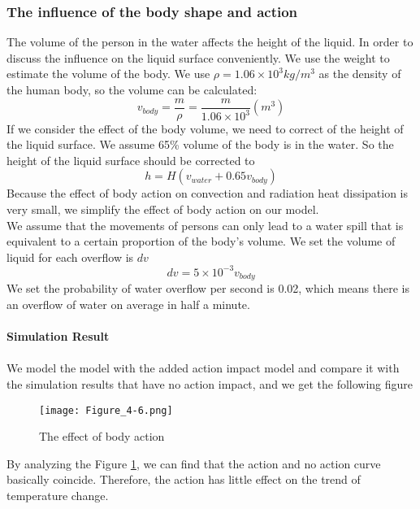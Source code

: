 \documentclass{mcmthesis}
\begin{document}
\subsubsection{The influence of the body shape and action}
The volume of the person in the water affects the height of the liquid. In order to discuss the influence on the liquid surface conveniently. We use the weight to estimate the volume of the body. We use $\rho =1.06\times10^{3}kg/m^{3}$ as the density of the human body, so the volume can be calculated:
\begin{equation}
v_{body}=\frac{m}{\rho }=\frac{m}{1.06\times 10^{3}}(m^{3})
\end{equation}
\indent If we consider the effect of the body volume, we need to correct of the height of the liquid surface. We assume 65\% volume of the body is in the water. So the height of the liquid surface should be corrected to\\
\begin{equation}
	h=H(v_{water}+0.65v_{body})
\end{equation}
\indent Because the effect of body action on convection and radiation heat dissipation is very small, we simplify the effect of body action on our model.\\
\indent We assume that the movements of persons can only lead to a water spill that is equivalent to a certain proportion of the body's volume. We set the volume of liquid for each overflow is $dv$
\begin{equation}
	dv=5\times10^{-3}v_{body}
\end{equation}
\indent We set the probability of water overflow per second is 0.02, which means there is an overflow of water on average in half a minute.\\\\
\noindent
\textbf{Simulation Result}\\\\
\indent We model the model with the added action impact model and compare it with the simulation results that have no action impact, and we get the following figure
\begin{figure}[H]
	\centerline{\texttt{[image: Figure\_4-6.png]}}
	\caption{The effect of body action}
	\label{action}	
\end{figure}
\indent By analyzing the Figure \ref{action}, we can find that the action and no action curve basically coincide. Therefore, the action has little effect on the trend of temperature change.
\end{document}
